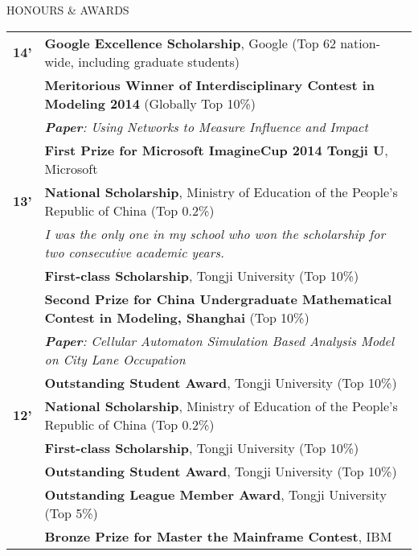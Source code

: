 \documentclass{resume} %
\begin{document}
\begin{rSection}{HONOURS \& AWARDS}

  \begin{tabular}{ @{} >{\bfseries}l @{\hspace{3ex}} l }
    14' & {\bf Google Excellence Scholarship}, Google (Top 62 nation-wide, including graduate students)     \\
        & {\bf Meritorious Winner of Interdisciplinary Contest in Modeling 2014} (Globally Top 10\%)       \\
    & {\em{\bf \space\space\space\space Paper}: Using Networks to Measure Influence and Impact}               \\
        & {\bf First Prize for Microsoft ImagineCup 2014 Tongji U}, Microsoft                               \\
    13' & {\bf National Scholarship}, Ministry of Education of the People’s Republic of China (Top 0.2\%)   \\
        & {\em \space\space\space\space I was the only one in my school who won the scholarship for two consecutive academic years.} \\
        & {\bf First-class Scholarship}, Tongji University (Top 10\%)                                       \\
        & {\bf Second Prize for China Undergraduate Mathematical Contest in Modeling, Shanghai} (Top 10\%) \\
    & {\em{\bf \space\space\space\space Paper}: Cellular Automaton Simulation Based Analysis Model
  on City Lane Occupation}\\
        & {\bf Outstanding Student Award}, Tongji University (Top 10\%)                                     \\
    12' & {\bf National Scholarship}, Ministry of Education of the People’s Republic of China (Top 0.2\%)   \\
        & {\bf First-class Scholarship}, Tongji University (Top 10\%)                                       \\
        & {\bf Outstanding Student Award}, Tongji University (Top 10\%)                                     \\
        & {\bf Outstanding League Member Award}, Tongji University (Top 5\%)                                \\
        & {\bf Bronze Prize for Master the Mainframe Contest}, IBM                                          \\
  \end{tabular}

\end{rSection}
\end{document}
